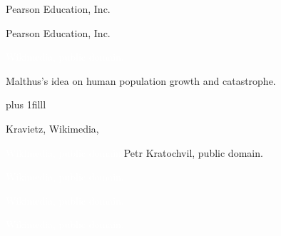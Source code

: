 \documentclass[t]{beamer}
\begin{document}
%
{
\begin{frame}[b]

\hfill\tiny\textcopyright Pearson Education, Inc.
\end{frame}
}
%
{
\begin{frame}[b]

\hfill\tiny\textcopyright Pearson Education, Inc.
\end{frame}
}
%
{
\begin{frame}[b]

\tiny\textcolor{white}{Wikimedia, public domain.}
\end{frame}
}
%
{
\begin{frame}[t]{Malthus's idea on human population growth and catastrophe.}

\vskip0pt plus 1filll

\hfill\tiny Kravietz, Wikimedia,
\end{frame}
}
%
{
\begin{frame}[b]

\tiny\textcolor{white}{Wikimedia, public domain.}\hspace*{50mm}Petr Kratochvil, public domain.
\end{frame}
}
%
{
\begin{frame}[b]

\tiny\textcolor{white}{Wikimedia, public domain.}
\end{frame}
}
%
{
\begin{frame}[b]

\tiny\textcolor{white}{Wikimedia, public domain.}
\end{frame}
}
%
{
\begin{frame}[b]

\hfill\tiny\textcolor{white}{Wikimedia, public domain.}
\end{frame}
}
%
\end{document}
